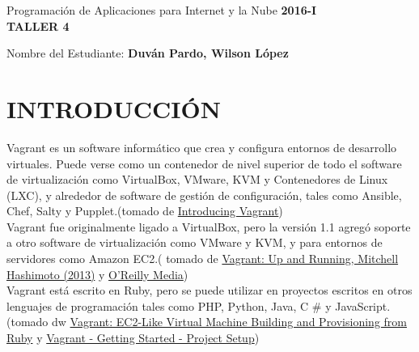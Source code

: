 \documentclass[10pt]{article}   			%
\begin{document}
	\renewcommand{\headrulewidth}{0.5pt}

	\thispagestyle{empty}						%
	\begin{center}
		\large {Programación de Aplicaciones para Internet y la Nube
			\hspace{5 cm}\textbf{2016-I}}
		\bigskip  
		\textbf{
				\LARGE{\\TALLER 4}}\\								%
	\end{center}	
	\begin{flushright}	
		\bigskip	
		Nombre del Estudiante: \textbf{Duván Pardo, Wilson López}			%
	\end{flushright} 
\section{INTRODUCCIÓN}
Vagrant es un software informático que crea y configura entornos de desarrollo virtuales. Puede verse como un contenedor de nivel superior de todo el software de virtualización como VirtualBox, VMware, KVM y Contenedores de Linux (LXC), y alrededor de software de gestión de configuración, tales como Ansible, Chef, Salty y Pupplet.(tomado de \href{http://www.linuxjournal.com/content/introducing-vagrant}{Introducing Vagrant})\\

Vagrant fue originalmente ligado a VirtualBox, pero la versión 1.1 agregó soporte a otro software de virtualización como VMware y KVM, y para entornos de servidores como Amazon EC2.( tomado de \href{http://cdn.oreillystatic.com/oreilly/booksamplers/9781449335830\_sampler.pdf}{Vagrant: Up and Running, Mitchell Hashimoto (2013)} y \href{https://en.wikipedia.org/wiki/O\%27Reilly\_Media}{O'Reilly Media})\\

Vagrant está escrito en Ruby, pero se puede utilizar en proyectos escritos en otros lenguajes de programación tales como PHP, Python, Java, C \# y JavaScript.
(tomado dw \href{http://www.rubyinside.com/vagrant-ruby-powered-virtualbox-vm-building-and-provisioning-3059.html}{Vagrant: EC2-Like Virtual Machine Building and Provisioning from Ruby} y \href{https://www.vagrantup.com/docs/getting-started/project\_setup.html}{Vagrant - Getting Started - Project Setup})\\
\end{document}
